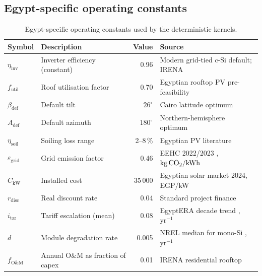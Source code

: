 \subsection{Egypt-specific operating constants}
\label{sec:constants}

\begin{table}[!htbp]
\centering
\footnotesize
\setlength{\tabcolsep}{4pt}
\renewcommand{\arraystretch}{1.15}
\begin{tabularx}{\linewidth}{@{}l X r X@{}}
\toprule
\textbf{Symbol} & \textbf{Description} & \textbf{Value} & \textbf{Source} \\
\midrule
$\eta_{\text{inv}}$         & Inverter efficiency (constant)        & 0.96
  & Modern grid-tied c-Si default; IRENA \citep{irena2023} \\
$f_{\text{util}}$           & Roof utilisation factor               & 0.70
  & Egyptian rooftop PV pre-feasibility \citep{mahmoud2023} \\
$\beta_{\text{def}}$        & Default tilt                          & $26^{\circ}$
  & Cairo latitude optimum \\
$A_{\text{def}}$            & Default azimuth                       & $180^{\circ}$
  & Northern-hemisphere optimum \\
$\eta_{\text{soil}}$        & Soiling loss range                    & 2--8\,\%
  & Egyptian PV literature \\
$\varepsilon_{\text{grid}}$ & Grid emission factor
  & 0.46
  & EEHC 2022/2023 \citep{eehc_emissions}, $\mathrm{kg\,\mathrm{CO_{2}}/kWh}$ \\
$C_{\text{kW}}$             & Installed cost                        & 35\,000
  & Egyptian solar market 2024, EGP/kW \\
$r_{\text{disc}}$           & Real discount rate                    & 0.04
  & Standard project finance \\
$i_{\text{tar}}$            & Tariff escalation (mean)              & 0.08
  & EgyptERA decade trend \citep{egyptera_tariff}, $\mathrm{yr^{-1}}$ \\
$d$                         & Module degradation rate               & 0.005
  & NREL median for mono-Si \citep{jordan2013}, $\mathrm{yr^{-1}}$ \\
$f_{\text{O\&M}}$           & Annual O\&M as fraction of capex      & 0.01
  & IRENA residential rooftop \citep{irena2023} \\
\bottomrule
\end{tabularx}
\caption{Egypt-specific operating constants used by the deterministic kernels.}
\label{tab:constants}
\end{table}


